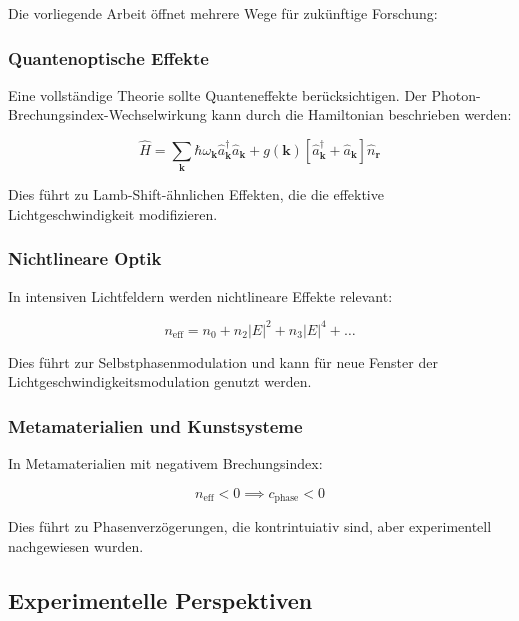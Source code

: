 \documentclass[12pt,a4paper,oneside]{article}
\theoremstyle{definition}
\theoremstyle{remark}
\newcommand{\cLight}{c}
\newcommand{\refIndex}{n}
\begin{document}
Die vorliegende Arbeit öffnet mehrere Wege für zukünftige Forschung:

\subsubsection{Quantenoptische Effekte}

Eine vollständige Theorie sollte Quanteneffekte berücksichtigen. Der Photon-Brechungsindex-Wechselwirkung kann durch die Hamiltonian beschrieben werden:

\begin{equation}
    \hat{H} = \sum_{\mathbf{k}} \hbar \omega_{\mathbf{k}} \hat{a}_{\mathbf{k}}^\dagger \hat{a}_{\mathbf{k}} + g(\mathbf{k}) [\hat{a}_{\mathbf{k}}^\dagger + \hat{a}_{\mathbf{k}}] \hat{n}_{\mathbf{r}}
\end{equation}

Dies führt zu Lamb-Shift-ähnlichen Effekten, die die effektive Lichtgeschwindigkeit modifizieren.

\subsubsection{Nichtlineare Optik}

In intensiven Lichtfeldern werden nichtlineare Effekte relevant:

\begin{equation}
    n_{\text{eff}} = n_0 + n_2 |E|^2 + n_3 |E|^4 + \ldots
\end{equation}

Dies führt zur Selbstphasenmodulation und kann für neue Fenster der Lichtgeschwindigkeitsmodulation genutzt werden.

\subsubsection{Metamaterialien und Kunstsysteme}

In Metamaterialien mit negativem Brechungsindex:

\begin{equation}
    \refIndex_{\text{eff}} < 0 \implies \cLight_{\text{phase}} < 0
\end{equation}

Dies führt zu Phasenverzögerungen, die kontrintuiativ sind, aber experimentell nachgewiesen wurden.

\subsection{Experimentelle Perspektiven}
\end{document}

